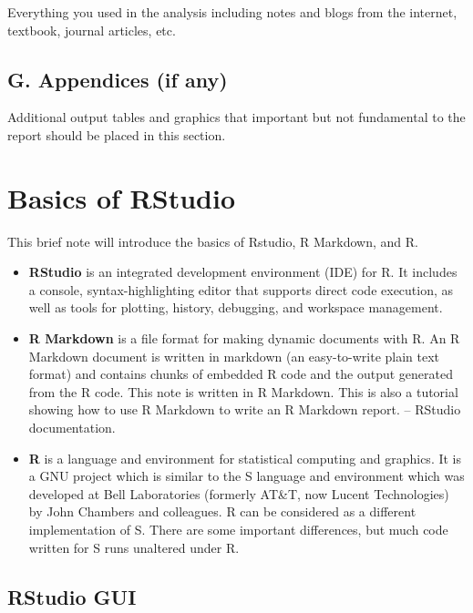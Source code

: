 \documentclass[
]{book}
\begin{document}
Everything you used in the analysis including notes and blogs from the internet, textbook, journal articles, etc.

\hypertarget{g.-appendices-if-any}{%
\subsection*{G. Appendices (if any)}\label{g.-appendices-if-any}}

Additional output tables and graphics that important but not fundamental to the report should be placed in this section.

\hypertarget{basics-of-rstudio}{%
\section{Basics of RStudio}\label{basics-of-rstudio}}

This brief note will introduce the basics of Rstudio, R Markdown, and R.

\begin{itemize}
\item
  \textbf{RStudio} is an integrated development environment (IDE) for R. It includes a console, syntax-highlighting editor that supports direct code execution, as well as tools for plotting, history, debugging, and workspace management.
\item
  \textbf{R Markdown} is a file format for making dynamic documents with R. An R Markdown document is written in markdown (an easy-to-write plain text format) and contains chunks of embedded R code and the output generated from the R code. This note is written in R Markdown. This is also a tutorial showing how to use R Markdown to write an R Markdown report. -- RStudio documentation.
\item
  \textbf{R} is a language and environment for statistical computing and graphics. It is a GNU project which is similar to the S language and environment which was developed at Bell Laboratories (formerly AT\&T, now Lucent Technologies) by John Chambers and colleagues. R can be considered as a different implementation of S. There are some important differences, but much code written for S runs unaltered under R.
\end{itemize}

\hypertarget{rstudio-gui}{%
\subsection{RStudio GUI}\label{rstudio-gui}}
\end{document}
